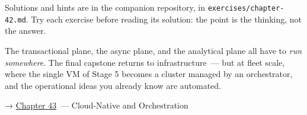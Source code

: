 \noindent{}Solutions and hints are in the companion repository, in \texttt{exercises/}\allowbreak{}\texttt{chapter-42.md}. Try each exercise before reading its solution: the point is the thinking, not the answer.

\label{42-data-analytics-plane:whats-next}

The transactional plane, the async plane, and the analytical plane all have to \emph{run somewhere}. The final capstone returns to infrastructure~--- but at fleet scale, where the single VM of Stage 5 becomes a cluster managed by an orchestrator, and the operational ideas you already know are automated.

\noindent{}→ \hyperref[ch:43-cloud-native-orchestration]{Chapter 43}~--- Cloud-Native and Orchestration
